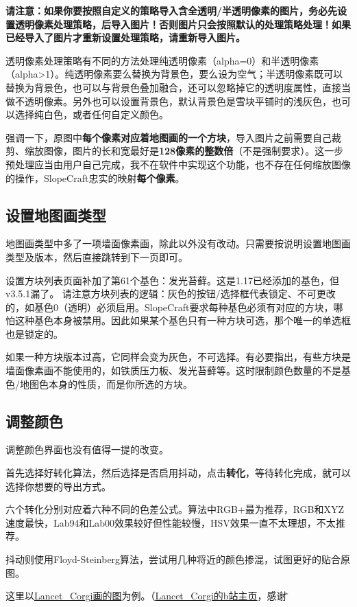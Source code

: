 \documentclass[UTF8]{ctexart}
\begin{document}
    \textbf{请注意：如果你要按照自定义的策略导入含全透明/半透明像素的图片，务必先设置透明像素处理策略，后导入图片！否则图片只会按照默认的处理策略处理！如果已经导入了图片才重新设置处理策略，请重新导入图片。}

    透明像素处理策略有不同的方法处理纯透明像素（alpha=0）和半透明像素（alpha>1）。纯透明像素要么替换为背景色，要么设为空气；半透明像素既可以替换为背景色，也可以与背景色叠加融合，还可以忽略掉它的透明度属性，直接当做不透明像素。另外也可以设置背景色，默认背景色是雪块平铺时的浅灰色，也可以选择纯白色，或者任何自定义颜色。

    强调一下，原图中\textbf{每个像素对应着地图画的一个方块}，导入图片之前需要自己裁剪、缩放图像，图片的长和宽最好是\textbf{128像素的整数倍}（不是强制要求）。这一步预处理应当由用户自己完成，我不在软件中实现这个功能，也不存在任何缩放图像的操作，SlopeCraft忠实的映射\textbf{每个像素}。

    \subsection{设置地图画类型}
    地图画类型中多了一项墙面像素画，除此以外没有改动。只需要按说明设置地图画类型及版本，然后直接跳转到下一页即可。

    设置方块列表页面补加了第61个基色：发光苔藓。这是1.17已经添加的基色，但v3.5.1漏了。
    请注意方块列表的逻辑：灰色的按钮/选择框代表锁定、不可更改的，如基色0（透明）必须启用。SlopeCraft要求每种基色必须有对应的方块，哪怕这种基色本身被禁用。因此如果某个基色只有一种方块可选，那个唯一的单选框也是锁定的。
    
    如果一种方块版本过高，它同样会变为灰色，不可选择。有必要指出，有些方块是墙面像素画不能使用的，如铁质压力板、发光苔藓等。这时限制颜色数量的不是基色/地图色本身的性质，而是你所选的方块。

    \subsection{调整颜色}
    调整颜色界面也没有值得一提的改变。
    
    首先选择好转化算法，然后选择是否启用抖动，点击\textbf{转化}，等待转化完成，就可以选择你想要的导出方式。
    
    六个转化分别对应着六种不同的色差公式。算法中RGB+最为推荐，RGB和XYZ速度最快，Lab94和Lab00效果较好但性能较慢，HSV效果一直不太理想，不太推荐。
    
    抖动则使用Floyd-Steinberg算法，尝试用几种将近的颜色掺混，试图更好的贴合原图。
    
    这里以\href{https://t.bilibili.com/544583492149793294}{Lancet\_Corgi画的图}为例。（\href{https://space.bilibili.com/37171000}{Lancet\_Corgi的b站主页}，感谢\~）
    
\end{document}
